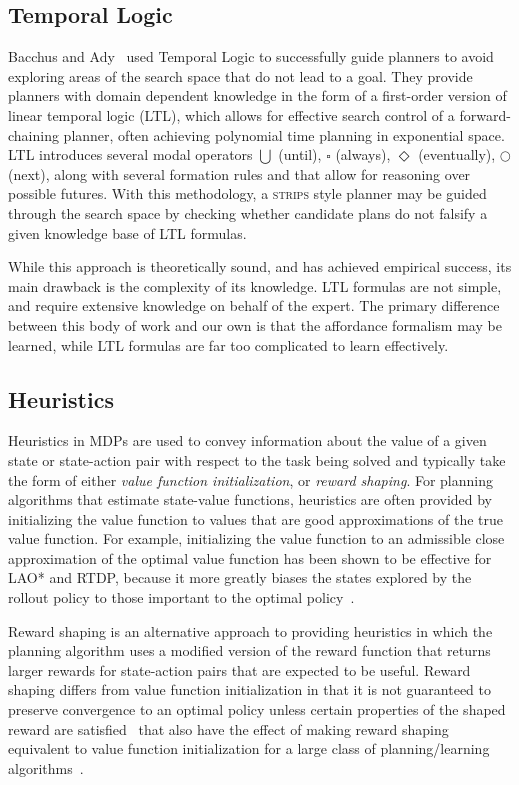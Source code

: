 \documentclass[conference]{IEEEtran}
\begin{document}
\subsection{Temporal Logic}

Bacchus and Ady~\citep{Bacchus95usingtemporal, Bacchus99usingtemporal} used Temporal Logic to successfully guide planners to avoid exploring areas of the search space that do not lead to a goal. They provide planners with domain dependent knowledge in the form of a first-order version of linear temporal logic (LTL), which allows for effective search control of a forward-chaining planner, often achieving polynomial time planning in exponential space. LTL introduces several modal operators $\bigcup$ (until), $\square$ (always), $\Diamond$ (eventually), $\bigcirc$ (next), along with several formation rules and that allow for reasoning over possible futures. With this methodology, a \textsc{strips} style planner may be guided through the search space by checking whether candidate plans do not falsify a given knowledge base of LTL formulas.

While this approach is theoretically sound, and has achieved empirical success, its main drawback is the complexity of its knowledge. LTL formulas are not simple, and require extensive knowledge on behalf of the expert. The primary difference between this body of work and our own is that the affordance formalism may be learned, while LTL formulas are far too complicated to learn effectively.

\subsection{Heuristics}
Heuristics in MDPs are used to convey information about the value of a given state or state-action pair with respect to the task being solved and typically take the form of either {\em value function initialization},
or {\em reward shaping}. For planning algorithms that estimate state-value functions, heuristics are often
provided by initializing the value function to values that are good approximations of the true value function. For example, initializing the value function to an admissible close approximation of the optimal value function has been shown to be effective for LAO* and RTDP, because it more greatly biases the states explored by the rollout policy to those important to the optimal policy~\citep{Hansen:1999qf}.

Reward shaping is an alternative approach to providing heuristics in which the planning algorithm uses a modified version of the reward function that returns larger rewards for state-action pairs that are expected to be useful. Reward shaping differs from value function initialization in that it is not guaranteed to preserve convergence to an optimal policy unless certain properties of the shaped reward are satisfied~\citep{potshap} that also have the effect of making reward shaping equivalent to value function initialization for a large class of planning/learning algorithms~\citep{Wiewiora:2003fk}.
\end{document}
